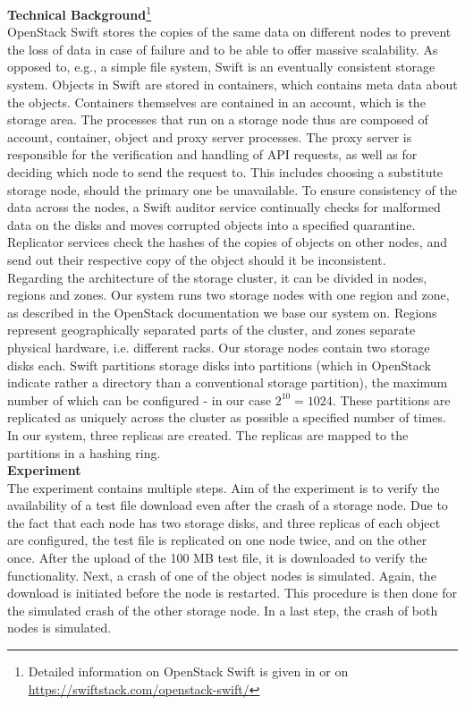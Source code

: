 \textbf{Technical Background}\footnote{Detailed information on OpenStack Swift is given in \cite{swift} or on \url{https://swiftstack.com/openstack-swift/}}\\
OpenStack Swift stores the copies of the same data on different nodes to prevent the loss of data in case of failure and to be able to offer massive scalability. As opposed to, e.g., a simple file system, Swift is an eventually consistent storage system. Objects in Swift are stored in containers, which contains meta data about the objects. Containers themselves are contained in an account, which is the storage area. The processes that run on a storage node thus are composed of account, container, object and proxy server processes. The proxy server is responsible for the verification and handling of API requests, as well as for deciding which node to send the request to. This includes choosing a substitute storage node, should the primary one be unavailable. To ensure consistency of the data across the nodes, a Swift auditor service continually checks for malformed data on the disks and moves corrupted objects into a specified quarantine. Replicator services check the hashes of the copies of objects on other nodes, and send out their respective copy of the object should it be inconsistent.\\

Regarding the architecture of the storage cluster, it can be divided in nodes, regions and zones. Our system runs two storage nodes with one region and zone, as described in the OpenStack documentation we base our system on. Regions represent geographically separated parts of the cluster, and zones separate physical hardware, i.e. different racks. Our storage nodes contain two storage disks each. Swift partitions storage disks into partitions (which in OpenStack indicate rather a directory than a conventional storage partition), the maximum number of which can be configured - in our case $2^{10} = 1024$. These partitions are replicated as uniquely across the cluster as possible a specified number of times. In our system, three replicas are created. The replicas are mapped to the partitions in a hashing ring. \\

\textbf{Experiment}\\
The experiment contains multiple steps. Aim of the experiment is to verify the availability of a test file download even after the crash of a storage node. Due to the fact that each node has two storage disks, and three replicas of each object are configured, the test file is replicated on one node twice, and on the other once. After the upload of the 100 MB test file, it is downloaded to verify the functionality. Next, a crash of one of the object nodes is simulated. Again, the download is initiated before the node is restarted. This procedure is then done for the simulated crash of the other storage node. In a last step, the crash of both nodes is simulated.\\

